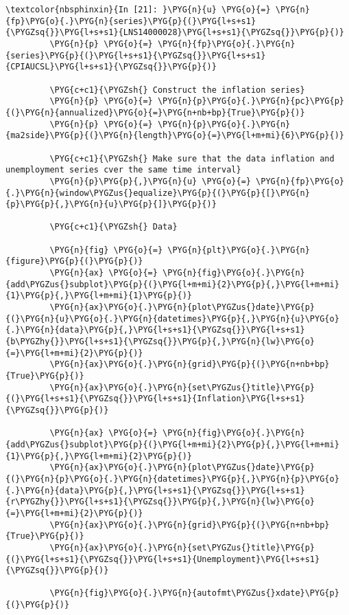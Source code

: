 \documentclass[letterpaper,10pt,openany,oneside,english]{sphinxmanual}
\begin{document}
%
\begin{Verbatim}[commandchars=\\\{\}]
\textcolor{nbsphinxin}{In [21]: }\PYG{n}{u} \PYG{o}{=} \PYG{n}{fp}\PYG{o}{.}\PYG{n}{series}\PYG{p}{(}\PYG{l+s+s1}{\PYGZsq{}}\PYG{l+s+s1}{LNS14000028}\PYG{l+s+s1}{\PYGZsq{}}\PYG{p}{)}
         \PYG{n}{p} \PYG{o}{=} \PYG{n}{fp}\PYG{o}{.}\PYG{n}{series}\PYG{p}{(}\PYG{l+s+s1}{\PYGZsq{}}\PYG{l+s+s1}{CPIAUCSL}\PYG{l+s+s1}{\PYGZsq{}}\PYG{p}{)}
         
         \PYG{c+c1}{\PYGZsh{} Construct the inflation series}
         \PYG{n}{p} \PYG{o}{=} \PYG{n}{p}\PYG{o}{.}\PYG{n}{pc}\PYG{p}{(}\PYG{n}{annualized}\PYG{o}{=}\PYG{n+nb+bp}{True}\PYG{p}{)}
         \PYG{n}{p} \PYG{o}{=} \PYG{n}{p}\PYG{o}{.}\PYG{n}{ma2side}\PYG{p}{(}\PYG{n}{length}\PYG{o}{=}\PYG{l+m+mi}{6}\PYG{p}{)}
         
         \PYG{c+c1}{\PYGZsh{} Make sure that the data inflation and unemployment series cver the same time interval}
         \PYG{n}{p}\PYG{p}{,}\PYG{n}{u} \PYG{o}{=} \PYG{n}{fp}\PYG{o}{.}\PYG{n}{window\PYGZus{}equalize}\PYG{p}{(}\PYG{p}{[}\PYG{n}{p}\PYG{p}{,}\PYG{n}{u}\PYG{p}{]}\PYG{p}{)}
         
         \PYG{c+c1}{\PYGZsh{} Data}
         
         \PYG{n}{fig} \PYG{o}{=} \PYG{n}{plt}\PYG{o}{.}\PYG{n}{figure}\PYG{p}{(}\PYG{p}{)}
         \PYG{n}{ax} \PYG{o}{=} \PYG{n}{fig}\PYG{o}{.}\PYG{n}{add\PYGZus{}subplot}\PYG{p}{(}\PYG{l+m+mi}{2}\PYG{p}{,}\PYG{l+m+mi}{1}\PYG{p}{,}\PYG{l+m+mi}{1}\PYG{p}{)}
         \PYG{n}{ax}\PYG{o}{.}\PYG{n}{plot\PYGZus{}date}\PYG{p}{(}\PYG{n}{u}\PYG{o}{.}\PYG{n}{datetimes}\PYG{p}{,}\PYG{n}{u}\PYG{o}{.}\PYG{n}{data}\PYG{p}{,}\PYG{l+s+s1}{\PYGZsq{}}\PYG{l+s+s1}{b\PYGZhy{}}\PYG{l+s+s1}{\PYGZsq{}}\PYG{p}{,}\PYG{n}{lw}\PYG{o}{=}\PYG{l+m+mi}{2}\PYG{p}{)}
         \PYG{n}{ax}\PYG{o}{.}\PYG{n}{grid}\PYG{p}{(}\PYG{n+nb+bp}{True}\PYG{p}{)}
         \PYG{n}{ax}\PYG{o}{.}\PYG{n}{set\PYGZus{}title}\PYG{p}{(}\PYG{l+s+s1}{\PYGZsq{}}\PYG{l+s+s1}{Inflation}\PYG{l+s+s1}{\PYGZsq{}}\PYG{p}{)}
         
         \PYG{n}{ax} \PYG{o}{=} \PYG{n}{fig}\PYG{o}{.}\PYG{n}{add\PYGZus{}subplot}\PYG{p}{(}\PYG{l+m+mi}{2}\PYG{p}{,}\PYG{l+m+mi}{1}\PYG{p}{,}\PYG{l+m+mi}{2}\PYG{p}{)}
         \PYG{n}{ax}\PYG{o}{.}\PYG{n}{plot\PYGZus{}date}\PYG{p}{(}\PYG{n}{p}\PYG{o}{.}\PYG{n}{datetimes}\PYG{p}{,}\PYG{n}{p}\PYG{o}{.}\PYG{n}{data}\PYG{p}{,}\PYG{l+s+s1}{\PYGZsq{}}\PYG{l+s+s1}{r\PYGZhy{}}\PYG{l+s+s1}{\PYGZsq{}}\PYG{p}{,}\PYG{n}{lw}\PYG{o}{=}\PYG{l+m+mi}{2}\PYG{p}{)}
         \PYG{n}{ax}\PYG{o}{.}\PYG{n}{grid}\PYG{p}{(}\PYG{n+nb+bp}{True}\PYG{p}{)}
         \PYG{n}{ax}\PYG{o}{.}\PYG{n}{set\PYGZus{}title}\PYG{p}{(}\PYG{l+s+s1}{\PYGZsq{}}\PYG{l+s+s1}{Unemployment}\PYG{l+s+s1}{\PYGZsq{}}\PYG{p}{)}
         
         \PYG{n}{fig}\PYG{o}{.}\PYG{n}{autofmt\PYGZus{}xdate}\PYG{p}{(}\PYG{p}{)}
\end{Verbatim}
\end{document}
